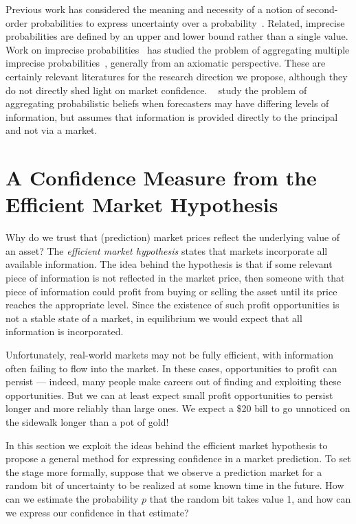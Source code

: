 \documentclass[sigconf,anonymous]{aamas}   %
\begin{document}
Previous work has considered the meaning and necessity of a notion of second-order probabilities to express uncertainty over a probability~\cite{baron1987second,goldsmith1983role,hansson2008we,pearl1987}. 
Related, imprecise probabilities are defined by an upper and lower bound rather than a single value. 
Work on imprecise probabilities~\cite{augustin2014introduction} has studied the problem of aggregating multiple imprecise probabilities~\cite{nau2002aggregation,stewart2018probabilistic,moral1998aggregation}, generally from an axiomatic perspective. 
These are certainly relevant literatures for the research direction we propose, although they do not directly shed light on market confidence. \citeauthor{frongillo2015elicitation}~\cite{frongillo2015elicitation} study the problem of aggregating probabilistic beliefs when forecasters may have differing levels of information, but assumes that information is provided directly to the principal and not via a market.


\section{A Confidence Measure from the Efficient Market Hypothesis}
\label{sec:emh}

Why do we trust that (prediction) market prices reflect the underlying value of an asset? The \emph{efficient market hypothesis} states that markets incorporate all available information. The idea behind the hypothesis is that if some relevant piece of information is not reflected in the market price, then someone with that piece of information could profit from buying or selling the asset until its price reaches the appropriate level. Since the existence of such profit opportunities is not a stable state of a market, in equilibrium we would expect that all information is incorporated. 

Unfortunately, real-world markets may not be fully efficient, with information often failing to flow into the market. In these cases, opportunities to profit can persist --- indeed, many people make careers out of finding and exploiting these opportunities. But we can at least expect small profit opportunities to persist longer and more reliably than large ones. We expect a \$20 bill to go unnoticed on the sidewalk longer than a pot of gold!

In this section we exploit the ideas behind the efficient market hypothesis to propose a general method for expressing confidence in a market prediction. To set the stage more formally, suppose that we observe a prediction market for a random bit of uncertainty to be realized at some known time in the future. How can we estimate the probability $p$ that the random bit takes value 1, and how can we express our confidence in that estimate?
\end{document}
